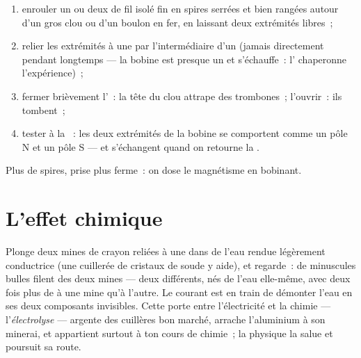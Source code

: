 \begin{method}\label{met:g8:electric-current-effects:wind}
\begin{enumerate}
  \item enrouler un ou deux  de fil isolé fin en spires
        serrées et bien rangées autour d'un gros clou ou d'un
        boulon en fer, en laissant deux extrémités libres~;
  \item relier les extrémités à une  par l'intermédiaire d'un
         (jamais directement pendant longtemps --- la
        bobine est presque un  et s'échauffe~: l' chaperonne l'expérience)~;
  \item fermer brièvement l'~: la tête du clou attrape
        des trombones~; l'ouvrir~: ils tombent~;
  \item tester à la ~: les deux extrémités de la bobine se
        comportent comme un pôle N et un pôle S --- et s'échangent
        quand on retourne la .
\end{enumerate}
Plus de spires, prise plus ferme~: on dose le magnétisme en
bobinant.
\end{method}

\section{L'effet chimique}

\begin{example}\label{ex:g8:electric-current-effects:electrolysis}
Plonge deux mines de crayon reliées à une  dans de l'eau rendue
légèrement conductrice (une cuillerée de cristaux de soude y aide),
et regarde~: de minuscules bulles filent des deux mines --- deux 
différents, nés de l'eau elle-même, avec deux fois plus de  à
une mine qu'à l'autre. Le courant est en train de démonter l'eau en
ses deux composants invisibles. Cette porte entre l'électricité et la
chimie --- l'\emph{électrolyse} --- argente des cuillères bon marché,
arrache l'aluminium à son minerai, et appartient surtout à ton cours
de chimie~; la physique la salue et poursuit sa route.
\end{example}

